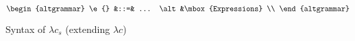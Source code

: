 \begin{figure*}
$$
\begin{altgrammar}
  \e{} &::=& ... \alt &\mbox{Expressions} \\
\end{altgrammar}
$$
\caption{Syntax of $\lambda c_s$ (extending $\lambda c$)}
\end{figure*}
